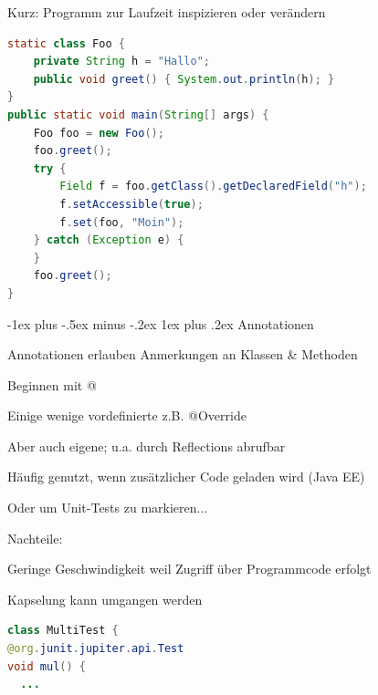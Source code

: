 \documentclass[10pt]{article}
\makeatletter
\renewcommand{\subsubsection}{\@startsection{subsubsection}{3}{0mm}%
                                {-1ex plus -.5ex minus -.2ex}%
                                {1ex plus .2ex}%
                                {\normalfont\small\bfseries}}
\makeatother
\begin{document}
Kurz: Programm zur Laufzeit inspizieren oder verändern

\begin{lstlisting}[language=java]
static class Foo {
    private String h = "Hallo";
    public void greet() { System.out.println(h); }
}
public static void main(String[] args) {
    Foo foo = new Foo();
    foo.greet();
    try {
        Field f = foo.getClass().getDeclaredField("h");
        f.setAccessible(true);
        f.set(foo, "Moin");
    } catch (Exception e) {
    }
    foo.greet();
}
\end{lstlisting}


\subsubsection{Annotationen}
\begin{itemize*}
  \item Annotationen erlauben Anmerkungen an Klassen \& Methoden
  \item Beginnen mit @
  \item Einige wenige vordefinierte z.B. @Override
  \item Aber auch eigene; u.a. durch Reflections abrufbar
  \item Häufig genutzt, wenn zusätzlicher Code geladen wird (Java EE)
  \item Oder um Unit-Tests zu markieren...
\end{itemize*}
Nachteile:
\begin{itemize*}
  \item Geringe Geschwindigkeit weil Zugriff über Programmcode erfolgt
  \item Kapselung kann umgangen werden
\end{itemize*}

\begin{lstlisting}[language=java]
class MultiTest {
@org.junit.jupiter.api.Test
void mul() {
  ...
\end{lstlisting}
\end{document}
